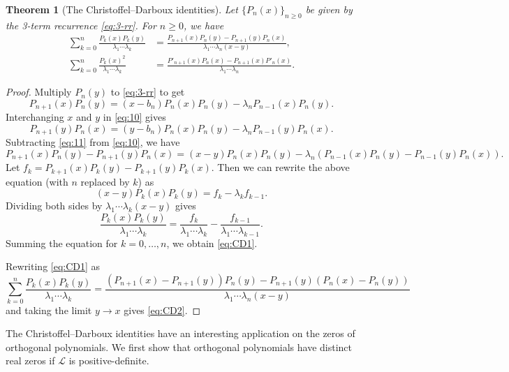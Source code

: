 \documentclass{amsart}
\numberwithin{equation}{section}
\newtheorem{thm}{Theorem}[section]
\theoremstyle{definition}
\newcommand\LL{\mathcal{L}}
\begin{document}
\begin{thm}[The Christoffel--Darboux identities]
  Let \( \{ P_n(x) \}_{n\ge 0} \) be given by the 3-term recurrence
  \eqref{eq:3-rr}. For \( n\ge0 \), we have
\begin{align}
  \label{eq:CD1}
  \sum_{k=0}^{n} \frac{P_k(x)P_k(y)}{\lambda_1\cdots\lambda_k}
  &= \frac{P_{n+1}(x)P_{n}(y) - P_{n+1}(y)P_{n}(x)}{\lambda_1\cdots\lambda_{n}(x-y)}, \\
  \label{eq:CD2}
  \sum_{k=0}^{n} \frac{P_k(x)^2}{\lambda_1\cdots\lambda_k}
  &= \frac{P'_{n+1}(x)P_{n}(x) - P_{n+1}(x)P'_{n}(x)}{\lambda_1\cdots\lambda_{n}}.
\end{align}
\end{thm}
\begin{proof}
  Multiply \( P_n(y) \) to \eqref{eq:3-rr} to get
  \begin{equation}\label{eq:10}
    P_{n+1}(x) P_n(y) = (x-b_n) P_n(x) P_n(y) - \lambda_n P_{n-1}(x) P_n(y).
  \end{equation}
  Interchanging \( x \) and \( y \) in \eqref{eq:10} gives
  \begin{equation}\label{eq:11}
    P_{n+1}(y) P_n(x) = (y-b_n) P_n(x) P_n(y) - \lambda_n P_{n-1}(y) P_n(x).
  \end{equation}
  Subtracting \eqref{eq:11} from \eqref{eq:10}, we have
  \[
    P_{n+1}(x) P_n(y) - P_{n+1}(y) P_n(x) = (x-y) P_n(x) P_n(y)
    - \lambda_n (P_{n-1}(x) P_n(y) - P_{n-1}(y) P_n(x)).
  \]
  Let \( f_k = P_{k+1}(x)P_{k}(y) - P_{k+1}(y)P_{k}(x) \). Then we can
  rewrite the above equation (with \( n \) replaced by \( k \)) as
  \[
    (x-y) P_k(x)P_k(y) = f_{k} - \lambda_k f_{k-1}.
  \]
  Dividing both sides by \( \lambda_1\cdots\lambda_k(x-y) \) gives
  \[
    \frac{P_k(x)P_k(y)}{\lambda_1\cdots\lambda_k} =
    \frac{f_{k}}{\lambda_1\cdots\lambda_k} -
    \frac{f_{k-1}}{\lambda_1\cdots\lambda_{k-1}}.
  \]
  Summing the equation for \( k=0,\dots,n \), we obtain \eqref{eq:CD1}.

  Rewriting  \eqref{eq:CD1} as
  \[
  \sum_{k=0}^{n} \frac{P_k(x)P_k(y)}{\lambda_1\cdots\lambda_k}
    = \frac{(P_{n+1}(x)-P_{n+1}(y))P_{n}(y) -
      P_{n+1}(y)(P_{n}(x)-P_{n}(y))}{\lambda_1\cdots\lambda_{n}(x-y)}
  \]
  and taking the limit \( y\to x \) gives \eqref{eq:CD2}.
\end{proof}

The Christoffel--Darboux identities have an interesting application on
the zeros of orthogonal polynomials. We first show that orthogonal
polynomials have distinct real zeros if \( \LL \) is
positive-definite.
\end{document}
